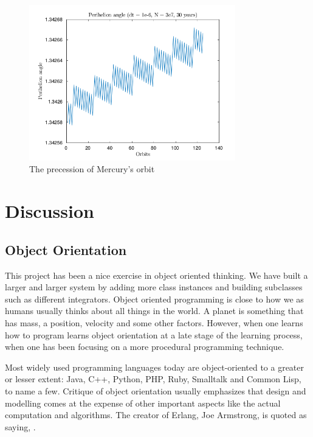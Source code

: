 \documentclass[10pt,a4paper]{amsart}
\begin{document}
\begin{figure}
	\centering
	\includegraphics[width=0.8\textwidth]{../figures/periangle30yrs.png}
	\caption{The precession of Mercury's orbit\label{fig:perangle}}
\end{figure}

\section{Discussion}

\subsection{Object Orientation}
This project has been a nice exercise in object oriented thinking. We have built a larger and larger system by adding more class instances and building subclasses such as different integrators. Object oriented programming is close to how we as humans usually thinks about all things in the world. A planet is something that has mass, a position, velocity and some other factors. However, when one learns how to program learns object orientation at a late stage of the learning process, when one has been focusing on a more procedural programming technique.

Most widely used programming languages today are object-oriented to a greater or lesser extent: Java, C++, Python, PHP, Ruby, Smalltalk and Common Lisp, to name a few. Critique of object orientation usually emphasizes that design and modelling comes at the expense of other important aspects like the actual computation and algorithms. The creator of Erlang, Joe Armstrong, is quoted as saying, . 
\end{document}
